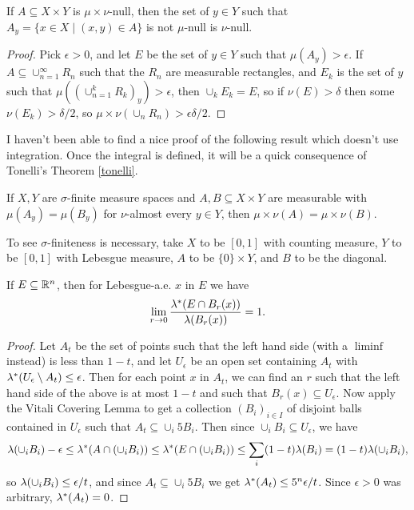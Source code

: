 \begin{prop}\label{product-null} If $A \subseteq X\times Y$ is $\mu\times\nu$-null, then the set of $y \in Y$ such that $A_y = \{x \in X \mid (x,y) \in A\}$ is not $\mu$-null is $\nu$-null.
\end{prop}
\begin{proof} Pick $\epsilon > 0$, and let $E$ be the set of $y \in Y$ such that $\mu(A_y) > \epsilon$. If $A \subseteq \cup_{n=1}^\infty R_n$ such that the $R_n$ are measurable rectangles, and $E_k$ is the set of $y$ such that $\mu((\cup_{n=1}^k R_k)_y) > \epsilon$, then $\cup_k E_k = E$, so if $\nu(E) > \delta$ then some $\nu(E_k) > \delta/2$, so $\mu\times\nu(\cup_n R_n) > \epsilon\delta/2$.
\end{proof}

I haven't been able to find a nice proof of the following result which doesn't use integration. Once the integral is defined, it will be a quick consequence of Tonelli's Theorem \eqref{tonelli}.

\begin{thm} If $X,Y$ are $\sigma$-finite measure spaces and $A,B \subseteq X\times Y$ are measurable with $\mu(A_y) = \mu(B_y)$ for $\nu$-almost every $y \in Y$, then $\mu\times\nu(A) = \mu\times\nu(B)$.
\end{thm}

\begin{ex} To see $\sigma$-finiteness is necessary, take $X$ to be $[0,1]$ with counting measure, $Y$ to be $[0,1]$ with Lebesgue measure, $A$ to be $\{0\}\times Y$, and $B$ to be the diagonal.
\end{ex}

\begin{thm}\label{lebesgue-density} If $E \subseteq \mathbb{R}^n$, then for Lebesgue-a.e. $x$ in $E$ we have
\[
\lim_{r \rightarrow 0} \frac{\lambda^*(E\cap B_r(x))}{\lambda(B_r(x))} = 1.
\]
\end{thm}
\begin{proof} Let $A_t$ be the set of points such that the left hand side (with a $\liminf$ instead) is less than $1-t$, and let $U_\epsilon$ be an open set containing $A_t$ with $\lambda^*(U_\epsilon \setminus A_t) \le \epsilon$. Then for each point $x$ in $A_t$, we can find an $r$ such that the left hand side of the above is at most $1-t$ and such that $B_r(x) \subseteq U_\epsilon$. Now apply the Vitali Covering Lemma to get a collection $(B_i)_{i \in I}$ of disjoint balls contained in $U_\epsilon$ such that $A_t \subseteq \cup_i 5B_i$. Then since $\cup_i B_i \subseteq U_\epsilon$, we have
\[
\lambda(\cup_i B_i)-\epsilon \le \lambda^*(A \cap (\cup_i B_i)) \le \lambda^*(E\cap (\cup_i B_i)) \le \sum_i (1-t)\lambda(B_i) = (1-t)\lambda(\cup_i B_i),
\]
so $\lambda(\cup_i B_i) \le \epsilon/t$, and since $A_t \subseteq \cup_i 5B_i$ we get $\lambda^*(A_t) \le 5^n\epsilon/t$. Since $\epsilon > 0$ was arbitrary, $\lambda^*(A_t) = 0$.
\end{proof}

